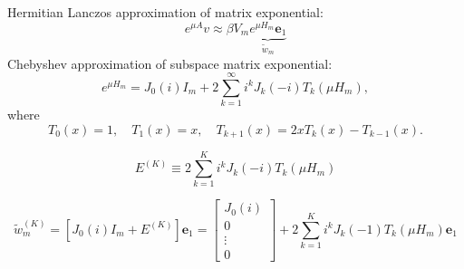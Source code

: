 \documentclass[12pt]{article}
\renewcommand{\vec}[1]{\mathbf{#1}}
\begin{document}
Hermitian Lanczos approximation of matrix exponential:
\[e^{\mu A}v\approx\beta V_m
  \underbrace{e^{\mu H_m}\vec{e}_1}_{\tilde{w}_m}\]
Chebyshev approximation of subspace matrix exponential:
\[e^{\mu H_m}=J_0(i)I_m +
  2\sum_{k=1}^\infty i^k J_k(-i) T_k(\mu H_m),\]
where
\[T_0(x) = 1,\quad
  T_1(x) = x,\quad
  T_{k+1}(x)=2xT_k(x)-T_{k-1}(x).\]

\[E^{(K)}\equiv
  2\sum_{k=1}^K i^k J_k(-i) T_k(\mu H_m)\]

\[\tilde{w}_m^{(K)} =
  \left[
    J_0(i)I_m +
    E^{(K)}
  \right]\vec{e}_1=
  \begin{bmatrix}
    J_0(i)\\
    0\\
    \vdots\\
    0
  \end{bmatrix} +
  2\sum_{k=1}^{K} i^kJ_k(-1)
  T_k(\mu H_m)\vec{e}_1
\]
\end{document}
